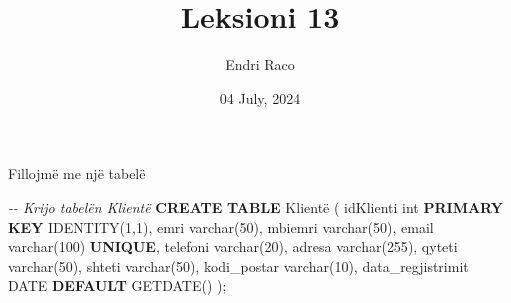 \documentclass[
  ignorenonframetext,
]{beamer}
\title{Leksioni 13}
\author{Endri Raco}
\date{04 July, 2024}
\newenvironment{Shaded}{\begin{snugshade}}{\end{snugshade}}
\newcommand{\CommentTok}[1]{\textcolor[rgb]{0.56,0.35,0.01}{\textit{#1}}}
\newcommand{\DataTypeTok}[1]{\textcolor[rgb]{0.13,0.29,0.53}{#1}}
\newcommand{\DecValTok}[1]{\textcolor[rgb]{0.00,0.00,0.81}{#1}}
\newcommand{\KeywordTok}[1]{\textcolor[rgb]{0.13,0.29,0.53}{\textbf{#1}}}
\newcommand{\NormalTok}[1]{#1}
\begin{document}
\frame{\titlepage}

\begin{frame}[allowframebreaks]
  \tableofcontents[hideallsubsections]
\end{frame}
\section{}\label{section}

\begin{frame}[fragile]{Fillojmë me një tabelë}
\label{fillojmuxeb-me-njuxeb-tabeluxeb}

\begin{Shaded}
\begin{Highlighting}[]
\CommentTok{{-}{-} Krijo tabelën Klientë}
\KeywordTok{CREATE} \KeywordTok{TABLE}\NormalTok{ Klientë (}
\NormalTok{  idKlienti }\DataTypeTok{int} \KeywordTok{PRIMARY} \KeywordTok{KEY}\NormalTok{ IDENTITY(}\DecValTok{1}\NormalTok{,}\DecValTok{1}\NormalTok{),}
\NormalTok{  emri }\DataTypeTok{varchar}\NormalTok{(}\DecValTok{50}\NormalTok{),}
\NormalTok{  mbiemri }\DataTypeTok{varchar}\NormalTok{(}\DecValTok{50}\NormalTok{),}
\NormalTok{  email }\DataTypeTok{varchar}\NormalTok{(}\DecValTok{100}\NormalTok{) }\KeywordTok{UNIQUE}\NormalTok{,}
\NormalTok{  telefoni }\DataTypeTok{varchar}\NormalTok{(}\DecValTok{20}\NormalTok{),}
\NormalTok{  adresa }\DataTypeTok{varchar}\NormalTok{(}\DecValTok{255}\NormalTok{),}
\NormalTok{  qyteti }\DataTypeTok{varchar}\NormalTok{(}\DecValTok{50}\NormalTok{),}
\NormalTok{  shteti }\DataTypeTok{varchar}\NormalTok{(}\DecValTok{50}\NormalTok{),}
\NormalTok{  kodi\_postar }\DataTypeTok{varchar}\NormalTok{(}\DecValTok{10}\NormalTok{),}
\NormalTok{  data\_regjistrimit }\DataTypeTok{DATE} \KeywordTok{DEFAULT}\NormalTok{ GETDATE()}
\NormalTok{);}
\end{Highlighting}
\end{Shaded}
\end{frame}
\end{document}
